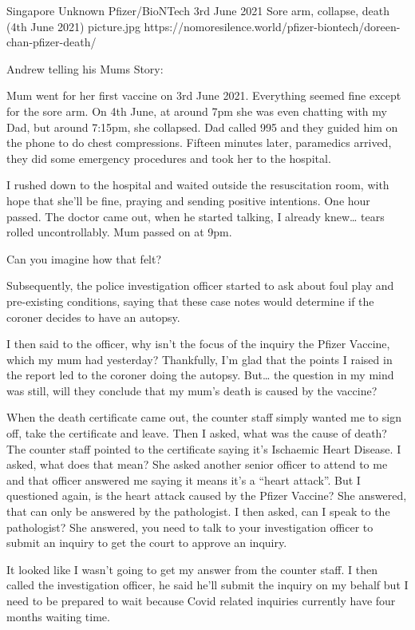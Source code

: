           {Singapore}
          {Unknown}
          {Pfizer/BioNTech}
          {3rd June 2021}
          {Sore arm, collapse, death (4th June 2021)}
          {picture.jpg}
          {https://nomoresilence.world/pfizer-biontech/doreen-chan-pfizer-death/}
          {

Andrew telling his Mums Story:

Mum went for her first vaccine on 3rd June 2021. Everything seemed fine except
for the sore arm. On 4th June, at around 7pm she was even chatting with my Dad,
but around 7:15pm, she collapsed. Dad called 995 and they guided him on the
phone to do chest compressions. Fifteen minutes later, paramedics arrived, they
did some emergency procedures and took her to the hospital.

I rushed down to the hospital and waited outside the resuscitation room, with
hope that she’ll be fine, praying and sending positive intentions. One hour
passed. The doctor came out, when he started talking, I already knew… tears
rolled uncontrollably. Mum passed on at 9pm.

Can you imagine how that felt?

Subsequently, the police investigation officer started to ask about foul play
and pre-existing conditions, saying that these case notes would determine if the
coroner decides to have an autopsy.

I then said to the officer, why isn’t the focus of the inquiry the Pfizer
Vaccine, which my mum had yesterday? Thankfully, I’m glad that the points I
raised in the report led to the coroner doing the autopsy. But… the question in
my mind was still, will they conclude that my mum’s death is caused by the
vaccine?

When the death certificate came out, the counter staff simply wanted me to sign
off, take the certificate and leave. Then I asked, what was the cause of death?
The counter staff pointed to the certificate saying it’s Ischaemic Heart
Disease. I asked, what does that mean? She asked another senior officer to
attend to me and that officer answered me saying it means it’s a “heart
attack”. But I questioned again, is the heart attack caused by the Pfizer
Vaccine? She answered, that can only be answered by the pathologist. I then
asked, can I speak to the pathologist? She answered, you need to talk to your
investigation officer to submit an inquiry to get the court to approve an
inquiry.

It looked like I wasn’t going to get my answer from the counter staff. I then
called the investigation officer, he said he’ll submit the inquiry on my behalf
but I need to be prepared to wait because Covid related inquiries currently have
four months waiting time.

}
